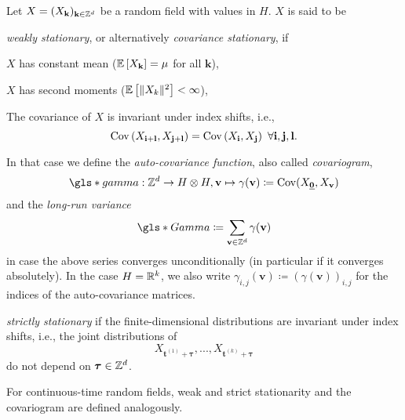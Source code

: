 \begin{defn}[Stationarity] \label{def:stationarity}
    Let $X = (X_\mathbf{k})_{\mathbf{k} \in \mathbb{Z}^d}$ be a random field with values in $H$. $X$ is said to be 
    \begin{aufzi}
        \item \textit{weakly stationary}, or alternatively \textit{covariance stationary}, if 
            \begin{aufzii}
                \item $X$ has constant mean ($\mathbb{E}\left[X_\mathbf{k}\right] = \mu$ for all $\mathbf{k}$),
                \item $X$ has second moments ($\mathbb{E}\left[\|X_k\|^2\right] < \infty$),
                \item The covariance of $X$ is invariant under index shifts, i.e.,
                \begin{equation*}
                    \mathrm{Cov}\left( X_{\mathbf{i} + \mathbf{l}}, X_{\mathbf{j} + \mathbf{l}} \right) = \mathrm{Cov}\left( X_{\mathbf{i}}, X_{\mathbf{j}} \right) \ \forall \mathbf{i}, \mathbf{j}, \mathbf{l}.
                \end{equation*}
            \end{aufzii}
            In that case we define the \textit{auto-covariance function}, also called \textit{covariogram},
            \begin{equation}
                \gls*{gamma}: \ZZ^d \to H \otimes H, \mathbf{v} \mapsto \gamma(\mathbf{v}) \coloneqq \Cov(X_{\usbf[0]}, X_{\mathbf{v}})
            \end{equation}
            and the \textit{long-run variance}
            \[ \gls*{Gamma} \coloneqq \sum\limits_{\mathbf{v} \in \ZZ^d} \gamma(\mathbf{v}) \]
            in case the above series converges unconditionally (in particular if it converges absolutely).
            In the case $H = \mathbb{R}^k$, we also write $\gamma_{i, j}(\mathbf{v}) \coloneqq (\gamma(\mathbf{v}))_{i, j}$ for the indices of the auto-covariance matrices.
        \item \textit{strictly stationary} if the finite-dimensional distributions are invariant under index shifts, i.e., the joint distributions of
        \[ X_{\mathbf{t}^{(1)} + \boldsymbol{\tau}}, ..., X_{\mathbf{t}^{(k)} + \boldsymbol{\tau}} \]
        do not depend on $\boldsymbol\tau \in \mathbb{Z}^d$.
    \end{aufzi}
    For continuous-time random fields, weak and strict stationarity and the covariogram are defined analogously.
\end{defn}

